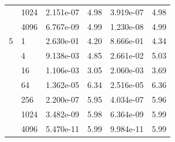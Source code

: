 \begin{table}[H]
\begin{center}
\begin{tabular}{llcccc}
  & 1024 & 2.151e-07 & 4.98 & 3.919e-07 & 4.98\\
  & 4096 & 6.767e-09 & 4.99 & 1.230e-08 & 4.99\\
\hline
5 & 1 & 2.630e-01 & 4.20 & 8.666e-01 & 4.34\\
  & 4 & 9.138e-03 & 4.85 & 2.661e-02 & 5.03\\
  & 16 & 1.106e-03 & 3.05 & 2.060e-03 & 3.69\\
  & 64 & 1.362e-05 & 6.34 & 2.516e-05 & 6.36\\
  & 256 & 2.200e-07 & 5.95 & 4.034e-07 & 5.96\\
  & 1024 & 3.482e-09 & 5.98 & 6.364e-09 & 5.99\\
  & 4096 & 5.470e-11 & 5.99 & 9.984e-11 & 5.99\\
\hline
\end{tabular}
\end{center}
\end{table}

